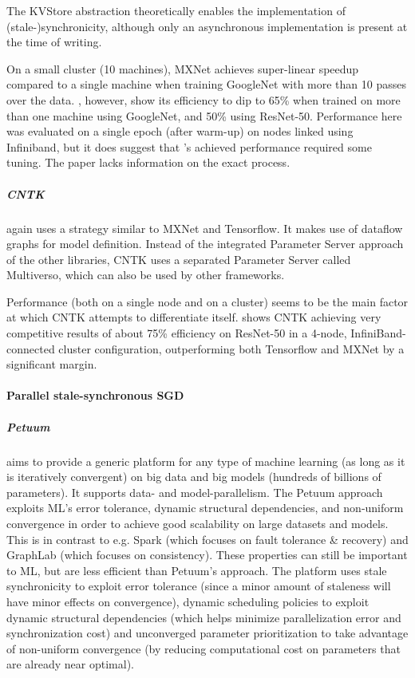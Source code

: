The KVStore abstraction theoretically enables the implementation of (stale-)synchronicity, although only an asynchronous implementation is present at the time of writing. 

On a small cluster (10 machines), MXNet achieves super-linear speedup compared to a single machine when training GoogleNet\citep{Szegedy2014} with more than 10 passes over the data. \citet{Shaohuai2017}, however, show its efficiency to dip to 65\% when trained on more than one machine using GoogleNet\citep{Szegedy2014}, and 50\% using ResNet-50\citet{He2015}. Performance here was evaluated on a single epoch (after warm-up) on nodes linked using Infiniband, but it does suggest that \citet{MXNet2015}'s achieved performance required some tuning. The paper lacks information on the exact process.

\subparagraph{CNTK}
again uses a strategy similar to MXNet and Tensorflow. It makes use of dataflow graphs for model definition. Instead of the integrated Parameter Server approach of the other libraries, CNTK uses a separated Parameter Server called Multiverso, which can also be used by other frameworks.

Performance (both on a single node and on a cluster) seems to be the main factor at which CNTK attempts to differentiate itself. \citet{Shaohuai2017} shows CNTK achieving very competitive results of about 75\% efficiency on ResNet-50\citep{He2015} in a 4-node, InfiniBand-connected cluster configuration, outperforming both Tensorflow and MXNet by a significant margin. 

\paragraph{Parallel stale-synchronous SGD}

\subparagraph{Petuum \citep{Xing2013}}
aims to provide a generic platform for any type of machine learning (as long as it is iteratively convergent) on big data and big models (hundreds of billions of parameters). It supports data- and model-parallelism. The Petuum approach exploits ML’s error tolerance, dynamic structural dependencies, and non-uniform convergence in order to achieve good scalability on large datasets and models. This is in contrast to e.g. Spark (which focuses on fault tolerance \& recovery) and GraphLab (which focuses on consistency). These properties can still be important to ML, but are less efficient than Petuum's approach. The platform uses stale synchronicity to exploit error tolerance (since a minor amount of staleness will have minor effects on convergence), dynamic scheduling policies to exploit dynamic structural dependencies (which helps minimize parallelization error and synchronization cost) and unconverged parameter prioritization to take advantage of non-uniform convergence (by reducing computational cost on parameters that are already near optimal). 

